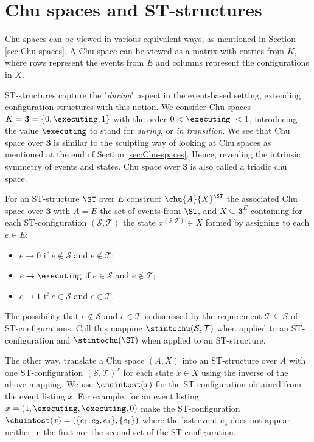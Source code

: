 \section{Chu spaces and ST-structures}
\label{sec:Chu-spaces-and-ST-structures}
    Chu spaces can be viewed in various equivalent ways, as mentioned in Section \ref{sec:Chu-spaces}. A Chu space can be viewed as a matrix with entries from $K$, where rows represent the events from $E$ and columns represent the configurations in $X$.
    
    ST-structures capture the "\emph{during}" aspect in the event-based setting, extending configuration structures with this notion. We consider Chu spaces $K= \mathbf{3}= \{0, \executing , 1\}$ with the order $0 < \executing\ < 1$, introducing the value $\executing$ to stand for \textit{during}, or \textit{in transition}. We see that Chu space over $\mathbf{3}$ is similar to the sculpting way of looking at Chu spaces as mentioned at the end of Section \ref{sec:Chu-spaces}. Hence, revealing the intrinsic symmetry of events and states. Chu space over $\mathbf{3}$ is also called a triadic chu space.


    \begin{definition}
        \label{def:ST-to-Chu}
        For an ST-structure $\ST$ over $E$ construct $\chu{A}{X}^{\ST}$ the associated Chu space over $\mathbf{3}$ with $A=E$ the set of events from $\ST$, and $X\subseteq \mathbf3^{E}$ containing for each ST-configuration $(\mathcal{S},\mathcal{T})$ the state $x^{(\mathcal{S},\mathcal{T})}\in X$ formed by assigning to each $e\in E$:
  
        \begin{itemize}
            \item $e \rightarrow 0$ if $e\not\in \mathcal{S}$ and $e\not\in \mathcal{T}$;
            \item $e \rightarrow \executing$ if $e\in \mathcal{S}$ and $e\not\in \mathcal{T}$;
            \item $e \rightarrow 1$ if $e\in \mathcal{S}$ and $e\in \mathcal{T}$.
        \end{itemize}
  
        The possibility that $e\notin \mathcal{S}$ and $e\in \mathcal{T}$ is dismissed by the requirement $\mathcal{T} \subseteq \mathcal{S}$ of ST-configurations.  Call this mapping $\stintochu(\mathcal{S},\mathcal{T})$ when applied to an ST-configuration and $\stintochu(\ST)$ when applied to an ST-structure.
  
        The other way, translate a Chu space $(A,X)$ into an ST-structure over $A$ with one ST-configuration $(\mathcal{S},\mathcal{T})^{x}$ for each state $x\in X$ using the inverse of the above mapping.  We use $\chuintost(x)$ for the ST-configuration obtained from the event listing $x$. For example, for an event listing $x=(1,\executing,\executing,0)$ make the ST-configuration $\chuintost(x)=(\{e_{1},e_{2},e_{3}\},\{e_{1}\})$ where the last event $e_{4}$ does not appear neither in the first nor the second set of the ST-configuration.
    \end{definition}

